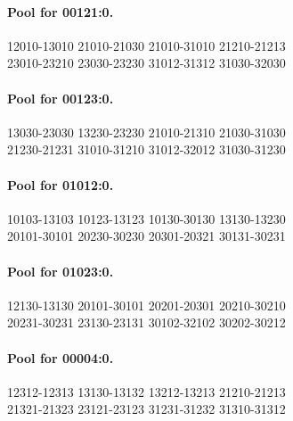 \documentclass[11pt]{article}
\theoremstyle{remark}
\numberwithin{equation}{section}
\numberwithin{table}{section}
\begin{document}
\paragraph{Pool for 00121:0.}
\begingroup\footnotesize\ttfamily\begin{flushleft}
12010-13010 21010-21030 21010-31010 21210-21213\\
23010-23210 23030-23230 31012-31312 31030-32030\\
\end{flushleft}\endgroup
\paragraph{Pool for 00123:0.}
\begingroup\footnotesize\ttfamily\begin{flushleft}
13030-23030 13230-23230 21010-21310 21030-31030\\
21230-21231 31010-31210 31012-32012 31030-31230\\
\end{flushleft}\endgroup
\paragraph{Pool for 01012:0.}
\begingroup\footnotesize\ttfamily\begin{flushleft}
10103-13103 10123-13123 10130-30130 13130-13230\\
20101-30101 20230-30230 20301-20321 30131-30231\\
\end{flushleft}\endgroup
\paragraph{Pool for 01023:0.}
\begingroup\footnotesize\ttfamily\begin{flushleft}
12130-13130 20101-30101 20201-20301 20210-30210\\
20231-30231 23130-23131 30102-32102 30202-30212\\
\end{flushleft}\endgroup
\paragraph{Pool for 00004:0.}
\begingroup\footnotesize\ttfamily\begin{flushleft}
12312-12313 13130-13132 13212-13213 21210-21213\\
21321-21323 23121-23123 31231-31232 31310-31312\\
\end{flushleft}\endgroup
\end{document}
